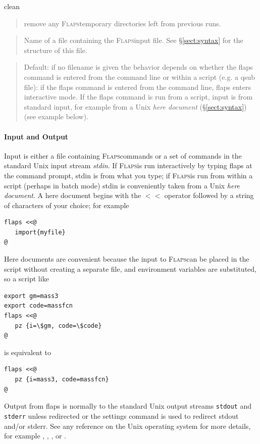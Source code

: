 \documentclass[11pt,openany,twoside]{book}
\numberwithin{equation}{section}		%
\newcommand{\Cmd}[1]{{\sf #1}}
\newcommand{\Newterm}[1]{{\em #1}}	%
\newcommand{\Code}[1]{{\small\tt #1}}
\newcommand{\Subst}[1]{{\small\sf #1}}
\newcommand{\Flaps}{\textsc{Flaps\:}}
\newcommand{\Spec}[1]{{\small\ttfamily #1}}
\newcommand{\Sectref}[1]{\S\ref{#1}}
\begin{document}
\par
\Spec{clean}
\begin{quote}
\par
remove any \Flaps temporary directories left from
previous runs.
\end{quote}

\par
\Spec{\Subst{filename}}
\begin{quote}
\par
Name of a file containing the \Flaps input file.
See \Sectref{sect:syntax} for
the structure of this file.
\end{quote}

\begin{quote}
Default: if no \Subst{filename}
is given the behavior depends on whether the \Cmd{flaps} command is entered
from the command line or within a script (e.g. a qsub file):
if the \Cmd{flaps} command
is entered from the command line, \Cmd{flaps} enters interactive mode.
If the \Cmd{flaps} command is run from a script, input is from standard input,
for example from a Unix
\Newterm{here document}
(\Sectref{sect:syntax}) (see example below).
\end{quote}
\par


\paragraph{Input and Output}
Input is either a file containing \Flaps commands or a set
of commands in the standard Unix input stream \Newterm{stdin}.
If \Flaps is run interactively by typing \Cmd{flaps} at
the command prompt, stdin is from what you type; if \Flaps is
run from within a script (perhaps in batch mode) stdin is
conveniently taken from a Unix \Newterm{here document}.
A here document begins with the
{\sffamily $<$$<$} operator followed by a string of characters of your choice; for
example
\begin{lstlisting}
flaps <<@
   import{myfile}
@
\end{lstlisting}

Here documents are convenient because the input to \Flaps can
be placed in the script without creating a separate file,
and environment variables are substituted, so a script like
\begin{lstlisting}
export gm=mass3
export code=massfcn
flaps <<@
   pz {i=\$gm, code=\$code}
@
\end{lstlisting}
is equivalent to
\begin{lstlisting}
flaps <<@
   pz {i=mass3, code=massfcn}
@
\end{lstlisting}
\par
Output from \Cmd{flaps} is normally to the standard Unix
output streams \Code{stdout} and \Code{stderr} unless redirected
or the \Cmd{settings} command is used to redirect stdout and/or
stderr. See any reference on the Unix operating system for more
details, for example \cite{gilly1992unix}, \cite{abrahams1992unix},
\cite{kernighan1984unix}, or \cite{rosenblatt1993learning}.
\end{document}
